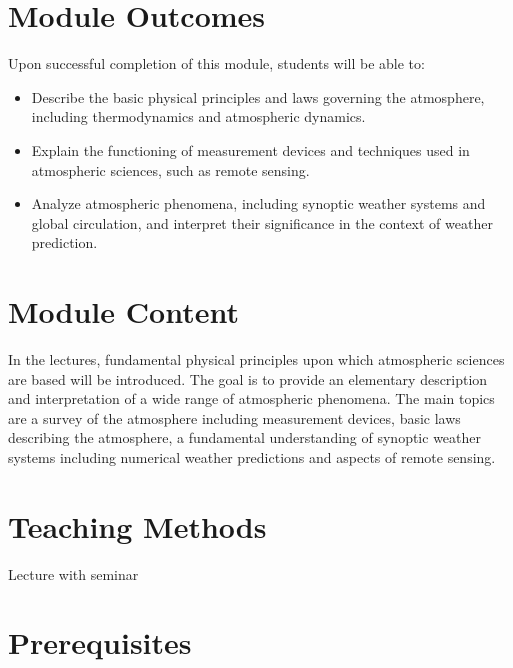 \documentclass[
  letterpaper,
  10pt,
  openany]{book}
\providecommand{\tightlist}{%
  \setlength{\itemsep}{0pt}\setlength{\parskip}{0pt}}\usepackage{longtable,booktabs,array}
\begin{document}
\section*{Module Outcomes}\label{module-outcomes-3}


Upon successful completion of this module, students will be able to:

\begin{itemize}
\tightlist
\item
  Describe the basic physical principles and laws governing the
  atmosphere, including thermodynamics and atmospheric dynamics.
\item
  Explain the functioning of measurement devices and techniques used in
  atmospheric sciences, such as remote sensing.
\item
  Analyze atmospheric phenomena, including synoptic weather systems and
  global circulation, and interpret their significance in the context of
  weather prediction.
\end{itemize}

\section*{Module Content}\label{module-content-4}


In the lectures, fundamental physical principles upon which atmospheric
sciences are based will be introduced. The goal is to provide an
elementary description and interpretation of a wide range of atmospheric
phenomena. The main topics are a survey of the atmosphere including
measurement devices, basic laws describing the atmosphere, a fundamental
understanding of synoptic weather systems including numerical weather
predictions and aspects of remote sensing.

\section*{Teaching Methods}\label{teaching-methods-4}


Lecture with seminar

\section*{Prerequisites}\label{prerequisites-4}
\end{document}
